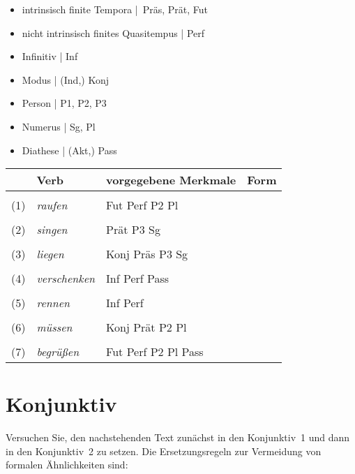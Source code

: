 \documentclass[12pt,a4paper,twoside]{article}
\newcommand{\Lf}{
  \setlength{\itemsep}{1pt}
  \setlength{\parskip}{0pt}
  \setlength{\parsep}{0pt}
}
\begin{document}
\begin{itemize}\Lf
  \item intrinsisch finite Tempora | Präs, Prät, Fut
  \item nicht intrinsisch finites Quasitempus | Perf
  \item Infinitiv | Inf
  \item Modus | (Ind,) Konj
  \item Person | P1, P2, P3
  \item Numerus | Sg, Pl
  \item Diathese | (Akt,) Pass
\end{itemize}

\begin{center}
  \begin{tabular}[h]{cllp{}}
    \toprule
    & \textbf{Verb} & \textbf{vorgegebene Merkmale} & \textbf{Form} \\
    \midrule
    &&& \\
    (1) & \textit{raufen} & Fut Perf P2 Pl & \\\cline{4-4}
    &&& \\
    (2) & \textit{singen} & Prät P3 Sg & \\\cline{4-4}
    &&& \\
    (3) & \textit{liegen} & Konj Präs P3 Sg & \\\cline{4-4}
    &&& \\
    (4) & \textit{verschenken} & Inf Perf Pass & \\\cline{4-4}
    &&& \\
    (5) & \textit{rennen} & Inf Perf & \\\cline{4-4}
    &&& \\
    (6) & \textit{müssen} & Konj Prät P2 Pl & \\\cline{4-4}
    &&& \\
    (7) & \textit{begrüßen} & Fut Perf P2 Pl Pass & \\\cline{4-4}
  \end{tabular}
\end{center}

\newpage

\section{Konjunktiv}

Versuchen Sie, den nachstehenden Text zunächst in den Konjunktiv~1 und dann in den Konjunktiv~2 zu setzen.
Die Ersetzungsregeln zur Vermeidung von formalen Ähnlichkeiten sind:
\end{document}
